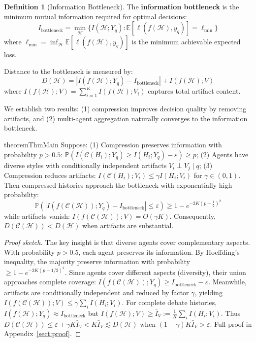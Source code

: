 \documentclass{article}
\theoremstyle{plain}
\theoremstyle{definition}
\newtheorem{definition}[theorem]{Definition}
\theoremstyle{remark}
\begin{document}
\begin{definition}[Information Bottleneck]
\label{def:bottleneck}
The \textbf{information bottleneck} is the minimum mutual information required for optimal decisions:
\begin{equation*}
I_{\text{bottleneck}} = \min_{\mathcal{H}} \{I(\mathcal{H}; Y_q) : \mathbb{E}[\ell(f(\mathcal{H}), y_q)] = \ell_{\min}\}
\end{equation*}
where $\ell_{\min} = \inf_{\mathcal{H}} \mathbb{E}[\ell(f(\mathcal{H}), y_q)]$ is the minimum achievable expected loss.
\end{definition}

Distance to the bottleneck is measured by:
\begin{equation}
D(\mathcal{H}) = |I(f(\mathcal{H}); Y_q) - I_{\text{bottleneck}}| + I(f(\mathcal{H}); V)
\end{equation}
where $I(f(\mathcal{H}); V) = \sum_{i=1}^K I(f(\mathcal{H}); V_i)$ captures total artifact content.

We establish two results: (1) compression improves decision quality by removing artifacts, and (2) multi-agent aggregation naturally converges to the information bottleneck.

\begin{restatable}{theorem}{ThmMain}
\label{thm:main}
Suppose: (1) Compression preserves information with probability $p > 0.5$: $\mathbb{P}(I(\mathcal{C}(H_i); Y_q) \geq I(H_i; Y_q) - \varepsilon) \geq p$; (2) Agents have diverse styles with conditionally independent artifacts $V_i \perp V_j \mid q$; (3) Compression reduces artifacts: $I(\mathcal{C}(H_i); V_i) \leq \gamma I(H_i; V_i)$ for $\gamma \in (0,1)$.
Then compressed histories approach the bottleneck with exponentially high probability:
\begin{equation}
\mathbb{P}(|I(f(\mathcal{C}(\mathcal{H})); Y_q) - I_{\text{bottleneck}}| \leq \varepsilon) \geq 1 - e^{-2K(p-\frac{1}{2})^2}
\end{equation}
while artifacts vanish: $I(f(\mathcal{C}(\mathcal{H})); V) = O(\gamma K)$. Consequently, $D(\mathcal{C}(\mathcal{H})) < D(\mathcal{H})$ when artifacts are substantial.
\end{restatable}

\begin{proof}[Proof sketch]
The key insight is that diverse agents cover complementary aspects. With probability $p > 0.5$, each agent preserves its information. By Hoeffding's inequality, the majority preserve information with probability $\geq 1 - e^{-2K(p-1/2)^2}$. Since agents cover different aspects (diversity), their union approaches complete coverage: $I(f(\mathcal{C}(\mathcal{H})); Y_q) \geq I_{\text{bottleneck}} - \varepsilon$. Meanwhile, artifacts are conditionally independent and reduced by factor $\gamma$, yielding $I(f(\mathcal{C}(\mathcal{H})); V) \leq \gamma \sum_i I(H_i; V_i)$. For complete debate histories, $I(f(\mathcal{H}); Y_q) \approx I_{\text{bottleneck}}$ but $I(f(\mathcal{H}); V) \geq \bar{I}_V := \frac{1}{K}\sum_i I(H_i; V_i)$. Thus $D(\mathcal{C}(\mathcal{H})) \leq \varepsilon + \gamma K \bar{I}_V < K\bar{I}_V \lesssim D(\mathcal{H})$ when $(1-\gamma)K\bar{I}_V > \varepsilon$. Full proof in Appendix~\ref{sect:proof}.
\end{proof}
\end{document}
